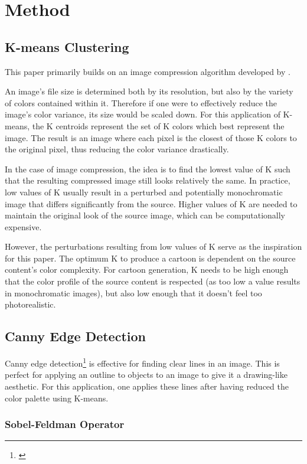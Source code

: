 \documentclass[11pt]{article}
\begin{document}
\section{Method}

\subsection{K-means Clustering}

This paper primarily builds on an image compression algorithm developed by \citealp{WanXing}.

An image's file size is determined both by its resolution, but also by the variety of colors contained within it.
Therefore if one were to effectively reduce the image's color variance, its size would be scaled down.
For this application of K-means, the K centroids represent the set of K colors which best represent the image.
The result is an image where each pixel is the closest of those K colors to the original pixel, thus reducing the color variance drastically.

In the case of image compression, the idea is to find the lowest value of K such that the resulting compressed image still looks relatively the same.
In practice, low values of K usually result in a perturbed and potentially monochromatic image that differs significantly from the source.
Higher values of K are needed to maintain the original look of the source image, which can be computationally expensive.

However, the perturbations resulting from low values of K serve as the inspiration for this paper.
The optimum K to produce a cartoon is dependent on the source content's color complexity.
For cartoon generation, K needs to be high enough that the color profile of the source content is respected
(as too low a value results in monochromatic images), but also low enough that it doesn't feel too photorealistic.

\subsection{Canny Edge Detection}

Canny edge detection\footnote{\citep{Canny1986ACA}} is effective for finding clear lines in an image.
This is perfect for applying an outline to objects to an image to give it a drawing-like aesthetic.
For this application, one applies these lines after having reduced the color palette using K-means.

\subsubsection{Sobel-Feldman Operator}
\end{document}
